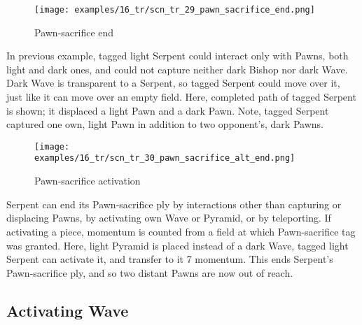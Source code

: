 \vspace*{-1.7\baselineskip}
\noindent
\begin{wrapfigure}[15]{l}{0.4\textwidth}
\centering
\texttt{[image: examples/16\_tr/scn\_tr\_29\_pawn\_sacrifice\_end.png]}
\vspace*{-0.4\baselineskip}
\caption{Pawn-sacrifice end}
\label{fig:scn_tr_29_pawn_sacrifice_end}
\end{wrapfigure}
In previous example, tagged light Serpent could interact only with Pawns, both light
and dark ones, and  could not capture neither dark Bishop nor dark Wave. Dark Wave
is transparent to a Serpent, so tagged Serpent could move over it, just like it can
move over an empty field. \newline
\indent
Here, completed path of tagged Serpent is shown; it displaced a light Pawn and a dark
Pawn. Note, tagged Serpent captured one own, light Pawn in addition to two opponent's,
dark Pawns.

\noindent
\begin{wrapfigure}[15]{l}{0.4\textwidth}
\centering
\texttt{[image: examples/16\_tr/scn\_tr\_30\_pawn\_sacrifice\_alt\_end.png]}
\vspace*{-0.4\baselineskip}
\caption{Pawn-sacrifice activation}
\label{fig:scn_tr_30_pawn_sacrifice_alt_end}
\end{wrapfigure}
Serpent can end its Pawn-sacrifice ply by interactions other than capturing or
displacing Pawns, by activating own Wave or Pyramid, or by teleporting. If activating
a piece, momentum is counted from a field at which Pawn-sacrifice tag was granted. \newline
\indent
Here, light Pyramid is placed instead of a dark Wave, tagged light Serpent can
activate it, and transfer to it 7 momentum. This ends Serpent's Pawn-sacrifice ply,
and so two distant Pawns are now out of reach.

\clearpage %

\subsection*{Activating Wave}
\label{sec:Tamoanchan Revisited/Serpent/Activating Wave}

